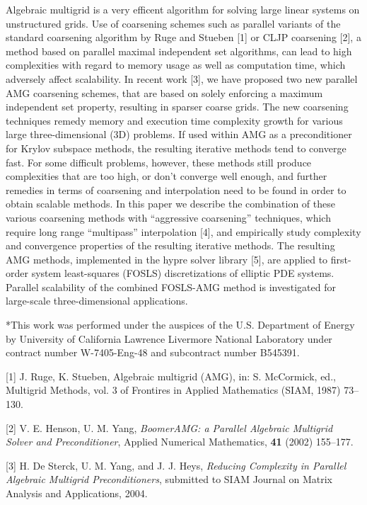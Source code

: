 \documentclass[twosided]{report}
\begin{document}
Algebraic multigrid is a very efficent algorithm for solving large
linear systems on unstructured grids. Use of coarsening schemes such as
parallel variants of the standard coarsening algorithm by Ruge and
Stueben [1] or CLJP coarsening [2], a method based on parallel maximal
independent set algorithms, can lead to high complexities with regard
to memory usage as well as computation time, which adversely affect
scalability.
In recent work [3], we have proposed two new parallel AMG coarsening
schemes, that are based on solely enforcing a maximum independent set
property, resulting in sparser coarse grids. The new coarsening
techniques remedy memory and execution time complexity growth for
various large three-dimensional (3D) problems. If used within AMG as a
preconditioner for Krylov subspace methods, the resulting iterative
methods tend to converge fast. For some difficult problems, however,
these methods still produce complexities that are too high, or don't
converge well enough, and further remedies in terms of coarsening and
interpolation need to be found in order to obtain scalable methods.
In this paper we describe the combination of these various coarsening
methods with ``aggressive coarsening'' techniques, which require long
range ``multipass'' interpolation [4], and empirically study complexity
and convergence properties of the resulting iterative methods. The
resulting AMG methods, implemented in the hypre solver library [5], are
applied to first-order system least-squares (FOSLS) discretizations of
elliptic PDE systems. Parallel scalability of the combined FOSLS-AMG
method is investigated for large-scale three-dimensional applications.

*This work was performed under the auspices of the U.S. Department of
Energy by University of California Lawrence Livermore National
Laboratory under contract number W-7405-Eng-48 and subcontract number
B545391.

[1] J. Ruge, K. Stueben, Algebraic multigrid (AMG), in: S. McCormick,
ed., Multigrid Methods, vol. 3 of Frontires in Applied Mathematics
(SIAM, 1987) 73--130.

[2] V. E. Henson, U. M. Yang,
{\em BoomerAMG: a Parallel Algebraic Multigrid
Solver and Preconditioner}, Applied Numerical Mathematics,
{\bf 41} (2002) 155--177.

[3] H. De Sterck, U. M. Yang, and J. J. Heys,
{\em Reducing Complexity in
Parallel Algebraic Multigrid Preconditioners}, submitted to SIAM Journal
on Matrix Analysis and Applications, 2004.
\end{document}

